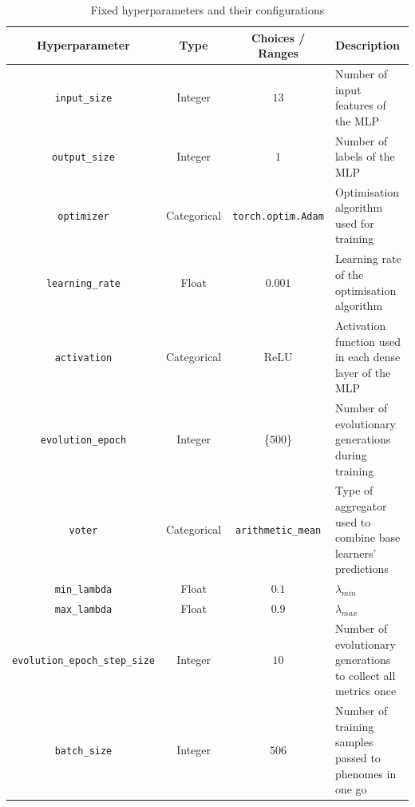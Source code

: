 \begin{table}[H]
    \centering
    \begin{tabular}{|c|c|c|p{5cm}|}
        \hline
        Hyperparameter & Type & Choices / Ranges & Description \\
        \hline
        \small\texttt{input\_size} & Integer & $13$ & Number of input features of the MLP \\
        \hline
        \small\texttt{output\_size} & Integer & $1$ & Number of labels of the MLP \\
        \hline
        \small\texttt{optimizer} & Categorical & \texttt{torch.optim.Adam} & Optimisation algorithm used for training \\
        \hline
        \small\texttt{learning\_rate} & Float & $0.001$ & Learning rate of the optimisation algorithm \\
        \hline
        \small\texttt{activation} & Categorical & ReLU & Activation function used in each dense layer of the MLP \\
        \hline
        \small\texttt{evolution\_epoch} & Integer & \{$500$\} & Number of evolutionary generations during training \\
        \hline
        \small\texttt{voter} & Categorical & \texttt{arithmetic\_mean} & Type of aggregator used to combine base learners' predictions \\
        \hline
        \small\texttt{min\_lambda} & Float & $0.1$ & $\lambda_{min}$ \\
        \hline
        \small\texttt{max\_lambda} & Float & $0.9$ & $\lambda_{max}$ \\
        \hline
        \small\texttt{evolution\_epoch\_step\_size} & Integer & $10$ & Number of evolutionary generations to collect all metrics once \\
        \hline
        \small\texttt{batch\_size} & Integer & $506$ & Number of training samples passed to phenomes in one go \\
        \hline
    \end{tabular}
    \caption{Fixed hyperparameters and their configurations}
    \label{table:experiment_4_fixed_hyperparameters}
\end{table}

